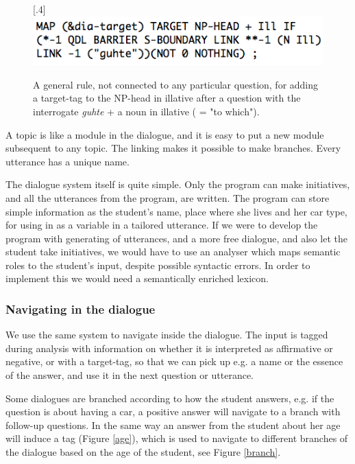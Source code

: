 \documentclass[11pt]{article}
\begin{document}
\begin{figure}[htbp]
\begin{center}
\scalebox{.4}[.4]{\includegraphics{presentation/img/targetIll2.png}}
\caption{A general rule, not connected to any particular question, for adding a target-tag to the NP-head in illative after a question with the interrogate \textit{guhte} + a noun in illative ( = "to which").}
\label{targetIll}
\end{center}
\end{figure}

A topic is like a module in the dialogue, and it is easy to put a new module subsequent to any topic. The linking makes it possible to make branches. Every utterance has a unique name.  

The dialogue system itself is quite simple. Only the program can make initiatives, and all the utterances from the program, are written. The program can store simple information as the student's name, place where she lives and her car type, for using in as a variable in a tailored utterance. If we were to develop the program with generating of utterances, and a more free dialogue, and also let the student take initiatives, we would have to use an analyser which maps semantic roles to the student's input, despite possible syntactic errors. In order to implement this we would need a semantically enriched lexicon.

\subsubsection{Navigating in the dialogue}\label{navigation}
We use the same system to navigate inside the dialogue. The input is tagged during analysis with information on whether it is interpreted as affirmative or negative, or with a target-tag, so that we can pick up e.g. a name or the essence of the answer, and use it in the next question or utterance. 

Some dialogues are branched according to how the student answers, e.g. if the question is about having a car, a positive answer will navigate to a branch with follow-up questions. In the same way an answer from the student about her age will induce a tag (Figure \ref{age}), which is used to navigate to different branches of the dialogue based on the age of the student, see Figure \ref{branch}.
\end{document}
